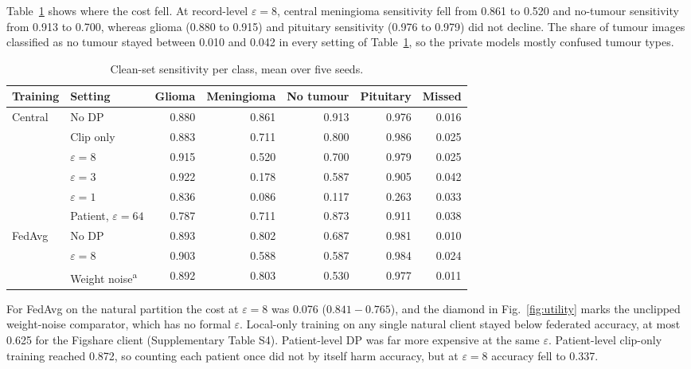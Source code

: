 \documentclass[preprint,12pt]{elsarticle}
\begin{document}
Table~\ref{tab:class} shows where the cost fell. At record-level $\varepsilon=8$, central meningioma sensitivity
fell from 0.861 to 0.520 and no-tumour sensitivity from 0.913 to 0.700, whereas glioma (0.880 to 0.915) and pituitary
sensitivity (0.976 to 0.979) did not decline. The share of tumour images classified as no tumour stayed between 0.010
and 0.042 in every setting of Table~\ref{tab:class}, so the private models mostly confused tumour types.

\begin{table}[htbp]
\caption{Clean-set sensitivity per class, mean over five seeds.}\label{tab:class}
\footnotesize\setlength{\tabcolsep}{2pt}
\begin{tabular*}{\linewidth}{@{\extracolsep{\fill}}llrrrrr@{}}
\toprule
Training & Setting & Glioma & Meningioma & No tumour & Pituitary & Missed\\
\midrule
Central & No DP & 0.880 & 0.861 & 0.913 & 0.976 & 0.016\\
 & Clip only & 0.883 & 0.711 & 0.800 & 0.986 & 0.025\\
 & $\varepsilon=8$ & 0.915 & 0.520 & 0.700 & 0.979 & 0.025\\
 & $\varepsilon=3$ & 0.922 & 0.178 & 0.587 & 0.905 & 0.042\\
 & $\varepsilon=1$ & 0.836 & 0.086 & 0.117 & 0.263 & 0.033\\
 & Patient, $\varepsilon=64$ & 0.787 & 0.711 & 0.873 & 0.911 & 0.038\\[2pt]
FedAvg & No DP & 0.893 & 0.802 & 0.687 & 0.981 & 0.010\\
 & $\varepsilon=8$ & 0.903 & 0.588 & 0.587 & 0.984 & 0.024\\
 & Weight noise\textsuperscript{a} & 0.892 & 0.803 & 0.530 & 0.977 & 0.011\\
\bottomrule
\end{tabular*}
\par{}
\end{table}

For FedAvg on the natural partition the cost at $\varepsilon=8$ was 0.076 ($0.841-0.765$), and the diamond in
Fig.~\ref{fig:utility} marks the unclipped weight-noise comparator, which has no formal $\varepsilon$. Local-only training on any
single natural client stayed below federated accuracy, at most 0.625 for the Figshare client (Supplementary Table S4).
Patient-level DP was far more expensive at the same $\varepsilon$. Patient-level clip-only training reached 0.872, so
counting each patient once did not by itself harm accuracy, but at $\varepsilon=8$ accuracy fell to 0.337.
\end{document}
